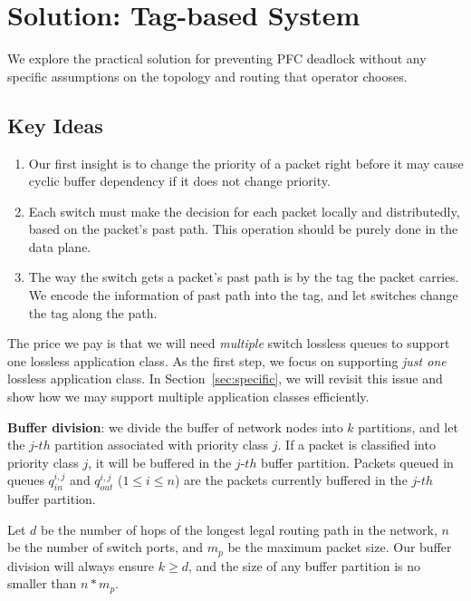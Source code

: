 \section{Solution: Tag-based System}\label{sec:generic}

We explore the practical solution for preventing PFC deadlock without any specific assumptions on the topology and routing that operator chooses.

\subsection{Key Ideas}

\begin{enumerate}
	\item Our first insight is to change the priority of a packet right before it may cause cyclic buffer dependency if it does not change priority.
	
	\item Each switch must make the decision for each packet locally and distributedly, based on the packet's past path. This operation should be purely done in the
	data plane.

	\item The way the switch gets a packet's past path is by the tag the packet carries. We encode the information of past path into the tag, and let switches change 
	the tag along the path. 

\end{enumerate}

The price we pay is that we will need {\em multiple} switch lossless queues to support one lossless application class. As the first step, we focus on supporting
{\em just one} lossless application class. In Section~\ref{sec:specific}, we will revisit this issue and show how we may support multiple application classes efficiently.


\textbf{Buffer division}: we divide the buffer of network nodes into $k$ partitions, and let the $j$-$th$ partition associated with priority class $j$. If a packet is classified into priority class $j$, it will  be buffered in the $j$-$th$ buffer partition. Packets queued in queues $q_{in}^{i,j}$ and $q_{out}^{i,j}$ ($1\leq i \leq n$) are the packets currently buffered in the $j$-$th$ buffer partition.

Let $d$ be the number of hops of the longest legal routing path in the network, $n$ be the number of switch ports, and $m_{p}$ be the maximum packet size. Our buffer division will always ensure $k \geq d$, and the size of any buffer partition is no smaller than $n*m_{p}$. 

